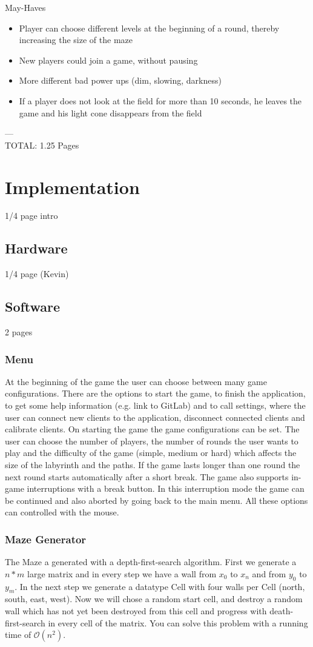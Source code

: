 \documentclass{sigchi}
\begin{document}
	May-Haves
	\begin{itemize}
		\item Player can choose different levels at the beginning of a round, thereby increasing the size of the maze
		\item New players could join a game, without pausing 
		\item More different bad power ups (dim, slowing, darkness)
		\item If a player does not look at the field for more than 10 seconds, he leaves the game and his light cone disappears from the field
		
	\end{itemize}
---\\
TOTAL: 1.25 Pages

\section{Implementation}
1/4 page intro
\subsection{Hardware}
1/4 page (Kevin)
\subsection{Software}
2 pages
\subsubsection{Menu}
At the beginning of the game the user can choose between many game configurations. There are the options to start the game, to finish the application, to get some help information (e.g. link to GitLab) and to call settings, where the user can connect new clients to the application, disconnect connected clients and calibrate clients. On starting the game the game configurations can be set. The user can choose the number of players, the number of rounds the user wants to play and the difficulty of the game (simple, medium or hard) which affects the size of the labyrinth and the paths. If the game lasts longer than one round the next round starts automatically after a short break. The game also supports in-game interruptions with a break button. In this interruption mode the game can be continued and also aborted by going back to the main menu. All these options can controlled with the mouse.
\subsubsection{Maze Generator} 
The Maze a generated with a depth-first-search algorithm. First we generate a $n*m$ large matrix and in every step we have a wall from $x_{0}$ to $x_{n}$ and from $y_{0}$ to $y_{m}$. In the next step we generate a datatype Cell with four walls per Cell (north, south, east, west). Now we will chose a random start cell, and destroy a random wall which has not yet been destroyed from this cell and progress with death-first-search in every cell of the matrix. You can solve this problem with a running time of $\mathcal{O}(n^2)$.
\end{document}
